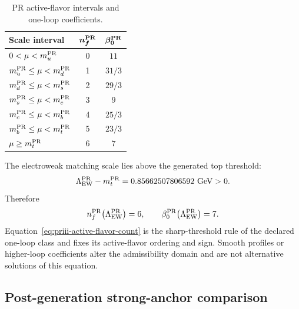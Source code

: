 \documentclass[11pt]{article}
\begin{document}
\begin{table}[htbp]
\centering
\caption{PR active-flavor intervals and one-loop coefficients.}
\label{tab:priii-strong-thresholds}
\begin{tabular}{lcc}
\toprule
\textbf{Scale interval} & \(\boldsymbol{n_f^{\rm PR}}\) & \(\boldsymbol{\beta_0^{\rm PR}}\) \\
\midrule
\(0<\mu<m_u^{\rm PR}\) & 0 & \(11\) \\
\(m_u^{\rm PR}\leq\mu<m_d^{\rm PR}\) & 1 & \(31/3\) \\
\(m_d^{\rm PR}\leq\mu<m_s^{\rm PR}\) & 2 & \(29/3\) \\
\(m_s^{\rm PR}\leq\mu<m_c^{\rm PR}\) & 3 & \(9\) \\
\(m_c^{\rm PR}\leq\mu<m_b^{\rm PR}\) & 4 & \(25/3\) \\
\(m_b^{\rm PR}\leq\mu<m_t^{\rm PR}\) & 5 & \(23/3\) \\
\(\mu\geq m_t^{\rm PR}\) & 6 & \(7\) \\
\bottomrule
\end{tabular}
\end{table}

The electroweak matching scale lies above the generated top threshold:
\begin{equation}
\Lambda_{\rm EW}^{\rm PR}
-
m_t^{\rm PR}
=
0.85662507806592\ {\rm GeV}>0.
\end{equation}
Therefore
\begin{equation}
n_f^{\rm PR}\!\left(\Lambda_{\rm EW}^{\rm PR}\right)=6,
\qquad
\beta_0^{\rm PR}\!\left(\Lambda_{\rm EW}^{\rm PR}\right)=7.
\label{eq:priii-strong-nf-ew}
\end{equation}
Equation~\eqref{eq:priii-active-flavor-count} is the sharp-threshold rule of the declared one-loop class and fixes its active-flavor ordering and sign.  Smooth profiles or higher-loop coefficients alter the admissibility domain and are not alternative solutions of this equation.

\subsection{Post-generation strong-anchor comparison}
\label{subsec:priii-strong-diagnostic-comparison}
\end{document}
